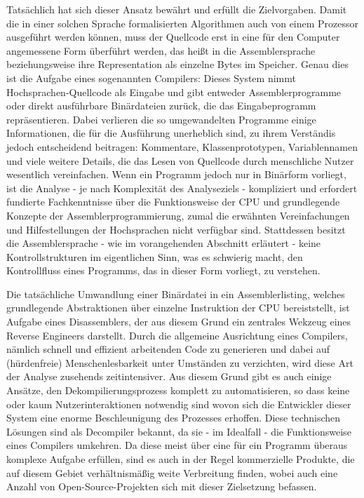 \documentclass[11pt]{article}
\begin{document}
Tatsächlich hat sich dieser Ansatz bewährt und erfüllt die Zielvorgaben. Damit die in einer solchen
Sprache formalisierten Algorithmen auch von einem Prozessor ausgeführt werden können, muss der Quellcode
erst in eine für den Computer angemessene Form überführt werden, das heißt in die Assemblersprache
beziehungsweise ihre Representation als einzelne Bytes im Speicher. Genau dies ist die Aufgabe eines
sogenannten Compilers: Dieses System nimmt Hochsprachen-Quellcode als Eingabe und gibt entweder
Assemblerprogramme oder direkt ausführbare Binärdateien zurück, die das Eingabeprogramm
repräsentieren. Dabei verlieren die so umgewandelten Programme einige Informationen, die für
die Ausführung unerheblich sind, zu ihrem Verständis jedoch entscheidend beitragen: Kommentare,
Klassenprototypen, Variablennamen und viele weitere Details, die das Lesen von Quellcode durch menschliche
Nutzer wesentlich vereinfachen. Wenn ein Programm jedoch nur in Binärform vorliegt,
ist die Analyse - je nach Komplexität des Analyseziels - kompliziert und
erfordert fundierte Fachkenntnisse über die Funktionsweise der CPU und grundlegende Konzepte der
Assemblerprogrammierung, zumal die erwähnten Vereinfachungen und Hilfestellungen der Hochsprachen
nicht verfügbar sind. Stattdessen besitzt die Assemblersprache - wie im vorangehenden Abschnitt
erläutert - keine Kontrollstrukturen im eigentlichen Sinn, was es schwierig macht,
den Kontrollfluss eines Programms, das in dieser Form vorliegt, zu verstehen.

Die tatsächliche
Umwandlung einer Binärdatei in ein Assemblerlisting, welches grundlegende Abstraktionen über
einzelne Instruktion der CPU bereiststellt, ist Aufgabe eines Disassemblers, der aus diesem Grund
ein zentrales Wekzeug eines Reverse Engineers darstellt. Durch die allgemeine Ausrichtung eines
Compilers, nämlich schnell und effizient arbeitenden Code zu generieren und dabei auf (hürdenfreie)
Menschenlesbarkeit unter Umständen zu verzichten, wird diese Art der Analyse zusehends zeitintensiver.
Aus diesem Grund gibt es auch einige Ansätze, den Dekompilierungsprozess komplett zu automatisieren, so dass
keine oder kaum Nutzerinteraktionen notwendig sind wovon sich die Entwickler dieser System eine enorme
Beschleunigung des Prozesses erhoffen. Diese technischen Lösungen sind als Decompiler bekannt, da sie
- im Idealfall - die Funktionsweise eines Compilers umkehren. Da diese meist über eine für ein Programm
überaus komplexe Aufgabe erfüllen, sind es auch in der Regel kommerzielle Produkte, die auf diesem
Gebiet verhältnismäßig weite Verbreitung finden, wobei auch eine Anzahl von Open-Source-Projekten
sich mit dieser Zielsetzung befassen.
\end{document}
